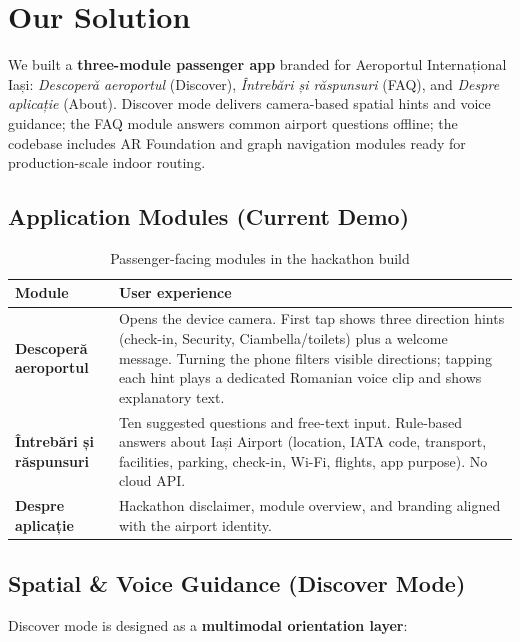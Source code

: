 \documentclass[11pt,a4paper]{article}
\begin{document}
\section{Our Solution}

\begin{solutionbox}
We built a \textbf{three-module passenger app} branded for Aeroportul Internațional Iași: \emph{Descoperă aeroportul} (Discover), \emph{Întrebări și răspunsuri} (FAQ), and \emph{Despre aplicație} (About). Discover mode delivers camera-based spatial hints and voice guidance; the FAQ module answers common airport questions offline; the codebase includes AR Foundation and graph navigation modules ready for production-scale indoor routing.
\end{solutionbox}

\subsection{Application Modules (Current Demo)}

\begin{table}[H]
\centering
\caption{Passenger-facing modules in the hackathon build}
\begin{tabular}{@{}p{3.2cm}p{10.3cm}@{}}
\toprule
\textbf{Module} & \textbf{User experience} \\
\midrule
\textbf{Descoperă aeroportul} &
Opens the device camera. First tap shows three direction hints (check-in, Security, Ciambella/toilets) plus a welcome message. Turning the phone filters visible directions; tapping each hint plays a dedicated Romanian voice clip and shows explanatory text. \\
\textbf{Întrebări și răspunsuri} &
Ten suggested questions and free-text input. Rule-based answers about Iași Airport (location, IATA code, transport, facilities, parking, check-in, Wi-Fi, flights, app purpose). No cloud API. \\
\textbf{Despre aplicație} &
Hackathon disclaimer, module overview, and branding aligned with the airport identity. \\
\bottomrule
\end{tabular}
\end{table}

\subsection{Spatial \& Voice Guidance (Discover Mode)}

Discover mode is designed as a \textbf{multimodal orientation layer}:
\end{document}
